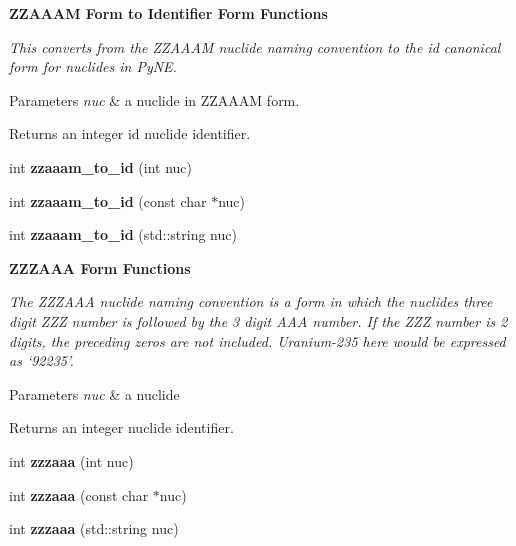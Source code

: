 \begin{Indent}\textbf{ Z\+Z\+A\+A\+AM Form to Identifier Form Functions}\par
{\em This converts from the Z\+Z\+A\+A\+AM nuclide naming convention to the id canonical form for nuclides in Py\+NE. 
\begin{DoxyParams}{Parameters}
{\em nuc} & a nuclide in Z\+Z\+A\+A\+AM form. \\
\hline
\end{DoxyParams}
\begin{DoxyReturn}{Returns}
an integer id nuclide identifier. 
\end{DoxyReturn}
}\begin{DoxyCompactItemize}
\item 
\mbox{\label{namespacepyne_1_1nucname_a91692dd60121331c14b1dbf0a37019d5}} 
int {\bfseries zzaaam\+\_\+to\+\_\+id} (int nuc)
\item 
\mbox{\label{namespacepyne_1_1nucname_a411c312b33b1af652a081491ed67fe7b}} 
int {\bfseries zzaaam\+\_\+to\+\_\+id} (const char $\ast$nuc)
\item 
\mbox{\label{namespacepyne_1_1nucname_ac99a1d1c1e89b821823e3f2cc8bd8070}} 
int {\bfseries zzaaam\+\_\+to\+\_\+id} (std\+::string nuc)
\end{DoxyCompactItemize}
\end{Indent}
\begin{Indent}\textbf{ Z\+Z\+Z\+A\+AA Form Functions}\par
{\em The Z\+Z\+Z\+A\+AA nuclide naming convention is a form in which the nuclides three digit Z\+ZZ number is followed by the 3 digit A\+AA number. If the Z\+ZZ number is 2 digits, the preceding zeros are not included. Uranium-\/235 here would be expressed as ‘92235’. 
\begin{DoxyParams}{Parameters}
{\em nuc} & a nuclide \\
\hline
\end{DoxyParams}
\begin{DoxyReturn}{Returns}
an integer nuclide identifier. 
\end{DoxyReturn}
}\begin{DoxyCompactItemize}
\item 
\mbox{\label{namespacepyne_1_1nucname_a2f94ab045f7240ac0138fd8c312408ba}} 
int {\bfseries zzzaaa} (int nuc)
\item 
\mbox{\label{namespacepyne_1_1nucname_a1f075bc8e768a5cea54b5d0d78df72a8}} 
int {\bfseries zzzaaa} (const char $\ast$nuc)
\item 
\mbox{\label{namespacepyne_1_1nucname_aff15f31b4762adb2707c267e9e07b9ac}} 
int {\bfseries zzzaaa} (std\+::string nuc)
\end{DoxyCompactItemize}
\end{Indent}
